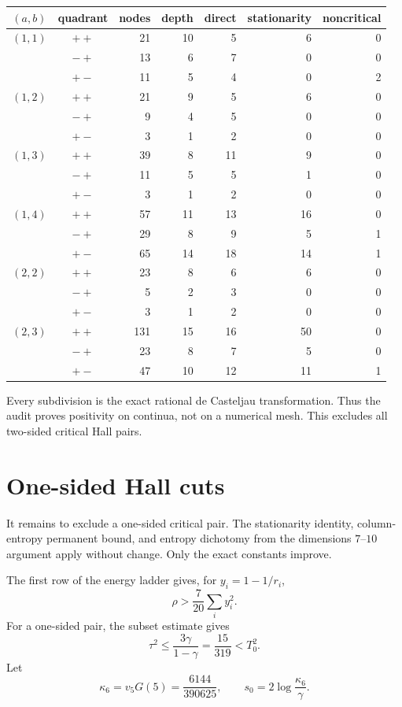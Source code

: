 \documentclass[11pt]{article}
\theoremstyle{definition}
\begin{document}
\begin{center}
\small
\begin{tabular}{c|c|r|r|r|r|r}
\toprule
$(a,b)$&quadrant&nodes&depth&direct&stationarity&noncritical\\
\midrule
$(1,1)$&$++$&21&10&5&6&0\\
       &$-+$&13&6&7&0&0\\
       &$+-$&11&5&4&0&2\\
\midrule
$(1,2)$&$++$&21&9&5&6&0\\
       &$-+$&9&4&5&0&0\\
       &$+-$&3&1&2&0&0\\
\midrule
$(1,3)$&$++$&39&8&11&9&0\\
       &$-+$&11&5&5&1&0\\
       &$+-$&3&1&2&0&0\\
\midrule
$(1,4)$&$++$&57&11&13&16&0\\
       &$-+$&29&8&9&5&1\\
       &$+-$&65&14&18&14&1\\
\midrule
$(2,2)$&$++$&23&8&6&6&0\\
       &$-+$&5&2&3&0&0\\
       &$+-$&3&1&2&0&0\\
\midrule
$(2,3)$&$++$&131&15&16&50&0\\
       &$-+$&23&8&7&5&0\\
       &$+-$&47&10&12&11&1\\
\bottomrule
\end{tabular}
\end{center}

Every subdivision is the exact rational de Casteljau transformation.  Thus the
audit proves positivity on continua, not on a numerical mesh.  This excludes
all two-sided critical Hall pairs.

\section{One-sided Hall cuts}

It remains to exclude a one-sided critical pair.  The stationarity identity,
column-entropy permanent bound, and entropy dichotomy from the dimensions
$7$--$10$ argument apply without change.  Only the exact constants improve.

The first row of the energy ladder gives, for
$y_i=1-1/r_i$,
\[
 \rho>\frac7{20}\sum_i y_i^2.
 \tag{6.1}\label{eq:row-energy6}
\]
For a one-sided pair, the subset estimate gives
\[
 \tau^2\le\frac{3\gamma}{1-\gamma}
 =\frac{15}{319}<T_0^2.
 \tag{6.2}\label{eq:one-sided-tau6}
\]
Let
\[
 \kappa_6=v_5G(5)=\frac{6144}{390625},
 \qquad
 s_0=2\log\frac{\kappa_6}{\gamma}.
\]
\end{document}
